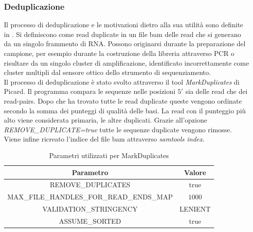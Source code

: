     \subsubsection{Deduplicazione}
    Il processo di deduplicazione e le motivazioni dietro alla sua utilit\`a sono definite in \cite{dedup}.
    Si definiscono come read duplicate in un file bam delle read che si generano da un singolo frammento di RNA.
    Possono originarsi durante la preparazione del campione, per esempio durante la costruzione della libreria attraverso PCR o risultare da un singolo cluster di amplificazione, identificato incorrettamente come cluster multipli dal sensore ottico dello strumento di sequenziamento.\\
    Il processo di deduplicazione \`e stato svolto attraverso il tool \emph{MarkDuplicates} di Picard.
    Il programma compara le sequenze nelle posizioni $5'$ sia delle read che dei read-pairs.
    Dopo che ha trovato tutte le read duplicate queste vengono ordinate secondo la somma dei punteggi di qualit\`a delle basi.
    La read con il punteggio pi\`u alto viene considerata primaria, le altre duplicati.
    Grazie all'opzione \emph{REMOVE\_DUPLICATE=true} tutte le sequenze duplicate vengono rimosse.
    Viene infine ricreato l'indice del file bam attraverso \emph{samtools index}.
    \begin{table}[H]
        \centering
        \begin{tabular}{|c|c|}
                \hline
                Parametro & Valore\\
                \hline
                REMOVE\_DUPLICATES & true\\
                \hline
                MAX\_FILE\_HANDLES\_FOR\_READ\_ENDS\_MAP & $1000$\\
                \hline
                VALIDATION\_STRINGENCY & LENIENT\\
                \hline
                ASSUME\_SORTED & true\\
                \hline
         \end{tabular}
         \caption{Parametri utilizzati per MarkDuplicates}
    \end{table}

